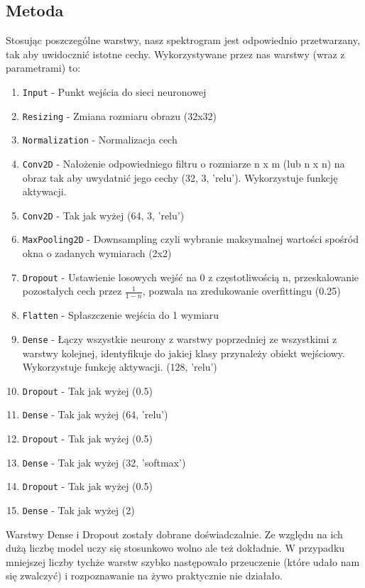 \documentclass[polish]{article}
\begin{document}
\subsection{Metoda}
Stosując poszczególne warstwy, nasz spektrogram jest odpowiednio przetwarzany, tak aby uwidocznić istotne cechy. Wykorzystywane przez nas warstwy (wraz z parametrami) to:
\begin{enumerate}
  \item\texttt{Input} - Punkt wejścia do sieci neuronowej
  \item\texttt{Resizing} - Zmiana rozmiaru obrazu (32x32)
  \item\texttt{Normalization} - Normalizacja cech
  \item\texttt{Conv2D} - Nałożenie odpowiedniego filtru o rozmiarze n x m (lub n x n) na obraz tak aby uwydatnić jego cechy (32, 3, 'relu'). Wykorzystuje funkcję aktywacji.
  \item\texttt{Conv2D} - Tak jak wyżej (64, 3, 'relu')
  \item\texttt{MaxPooling2D} - Downsampling czyli wybranie maksymalnej wartości spośród okna o zadanych wymiarach (2x2)
  \item\texttt{Dropout} - Ustawienie losowych wejść na 0 z częstotliwością n, przeskalowanie pozostałych cech przez 
  $\frac{1}{1-n}$, pozwala na zredukowanie overfittingu (0.25)
  \item\texttt{Flatten} - Spłaszczenie wejścia do 1 wymiaru
  \item\texttt{Dense} - Łączy wszystkie neurony z warstwy poprzedniej ze wszystkimi z warstwy kolejnej, identyfikuje do jakiej klasy przynależy obiekt wejściowy. Wykorzystuje funkcję aktywacji. (128, 'relu')
  \item\texttt{Dropout} - Tak jak wyżej (0.5)
  \item\texttt{Dense} - Tak jak wyżej (64, 'relu')
  \item\texttt{Dropout} - Tak jak wyżej (0.5)
  \item\texttt{Dense} - Tak jak wyżej (32, 'softmax')
  \item\texttt{Dropout} - Tak jak wyżej (0.5)
  \item\texttt{Dense} - Tak jak wyżej (2)
\end{enumerate}
Warstwy Dense i Dropout zostały dobrane doświadczalnie. Ze względu na ich dużą liczbę model uczy się stosunkowo wolno ale też dokładnie. W przypadku mniejszej liczby tychże warstw szybko następowało przeuczenie  (które udało nam się zwalczyć) i rozpoznawanie na żywo praktycznie nie działało.
\end{document}
